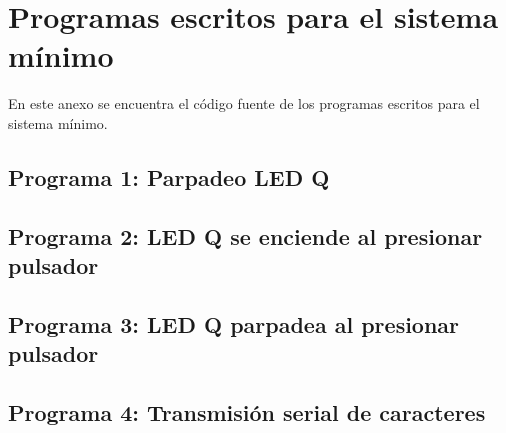 \chapter{Programas escritos para el sistema mínimo}
\label{C:anexo-programas-sistema-mínimo}

En este anexo se encuentra el código fuente de los programas escritos para el sistema mínimo.

\section{Programa 1: Parpadeo LED Q}
\label{C:anexo-prog-1}

\clearpage

\footnotesize

\clearpage

\section{Programa 2: LED Q se enciende al presionar pulsador}
\label{C:anexo-prog-2}


\clearpage

\section{Programa 3: LED Q parpadea al presionar pulsador}
\label{C:anexo-prog-3}


\clearpage

\section{Programa 4: Transmisión serial de caracteres}
\label{C:anexo-prog-4}


\normalsize